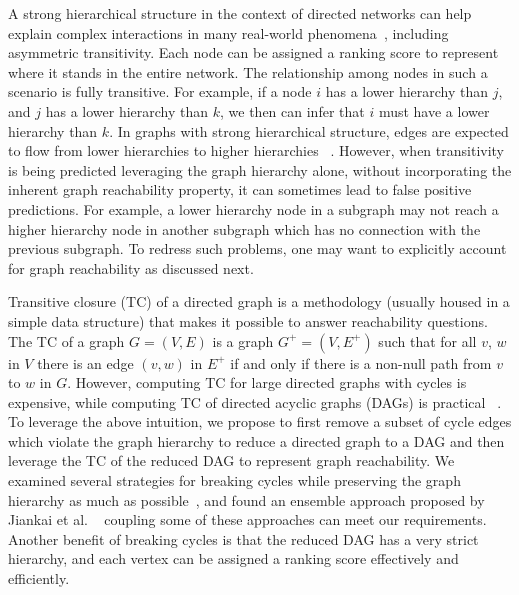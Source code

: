 \documentclass[letterpaper]{article} \usepackage{aaai19}  \usepackage{times}  \usepackage{helvet}  \usepackage{courier}  \usepackage{url}  \usepackage{graphicx}  \usepackage{booktabs} \usepackage{xcolor}
\begin{document}
A strong hierarchical structure in the context of directed networks can help explain complex interactions in many real-world phenomena~\cite{tatti2015}, including asymmetric transitivity. Each node can be assigned a ranking score to represent where it stands in the entire network. The relationship among nodes in such a scenario is fully transitive. For example, if a node $i$ has a lower hierarchy than $j$, and $j$ has a lower hierarchy than $k$, we then can infer that $i$ must have a lower hierarchy than $k$. In graphs with strong hierarchical structure, edges are expected to flow from lower hierarchies to higher hierarchies ~\cite{Gupte2011agony,tatti2015}. However, when transitivity is being predicted leveraging the graph hierarchy alone, without incorporating the inherent graph reachability property, it can sometimes lead to false positive predictions. For example, a lower hierarchy node in a subgraph may not reach a higher hierarchy node in another subgraph which has no connection with the previous subgraph. To redress such problems, one may want to explicitly account for graph reachability as discussed next.

Transitive closure (TC) of a directed graph is a methodology (usually housed in a simple data structure) that makes it possible to answer reachability questions. The TC of a graph $G = (V,E)$ is a graph $G^{+} = (V,E^{+})$ such that for all $v$, $w$ in $V$ there is an edge $(v,w)$ in $E^{+}$ if and only if there is a non-null path from $v$ to $w$ in $G$. However, computing TC for large directed graphs with cycles is expensive, while computing TC of directed acyclic graphs (DAGs) is practical ~\cite{SIMON1988325}. To leverage the above intuition, we propose to first remove a subset of cycle edges which violate the graph hierarchy to reduce a directed graph to a DAG and then leverage the TC of the reduced DAG to represent graph reachability. We examined several strategies for breaking cycles while preserving the graph hierarchy as much as possible~\cite{trueskill2007,tatti2015}, and found an ensemble approach proposed by Jiankai et al. ~\cite{Sun2017} coupling some of these approaches can meet our requirements. Another benefit of breaking cycles is that the reduced DAG has a very strict hierarchy, and each vertex can be assigned a ranking score effectively and efficiently. 
\end{document}
